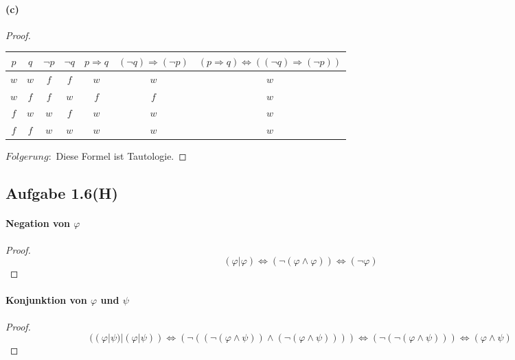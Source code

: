 \paragraph{(c)}
\begin{proof}
$ $\newline
\begin{center}
\begin{tabular}{||c|c||c|c|c|c|c||}
\hline
$p$ & $q$ & $\neg p$ & $\neg q$ & $p\Rightarrow q$ & $(\neg q)\Rightarrow(\neg p)$ & $(p\Rightarrow q)\Leftrightarrow((\neg q)\Rightarrow(\neg p))$ \\
\hline
\hline
$w$ & $w$ & $f$ & $f$ & $w$ & $w$ & $w$ \\
$w$ & $f$ & $f$ & $w$ & $f$ & $f$ & $w$ \\
$f$ & $w$ & $w$ & $f$ & $w$ & $w$ & $w$ \\
$f$ & $f$ & $w$ & $w$ & $w$ & $w$ & $w$ \\
\hline
\end{tabular}
\end{center}
$Folgerung:$ Diese Formel ist Tautologie.
\end{proof}

\newpage

\subsection{Aufgabe 1.6(H)}

\paragraph{Negation von $\varphi$}
\begin{proof}
\begin{equation*}
(\varphi|\varphi)\Leftrightarrow(\neg(\varphi\wedge\varphi))\Leftrightarrow(\neg\varphi)
\end{equation*}
\end{proof}

\paragraph{Konjunktion von $\varphi$ und $\psi$}
\begin{proof}
\begin{equation*}
((\varphi|\psi)|(\varphi|\psi))\Leftrightarrow(\neg((\neg(\varphi\wedge\psi))\wedge(\neg(\varphi\wedge\psi))))\Leftrightarrow(\neg(\neg(\varphi\wedge\psi)))\Leftrightarrow(\varphi\wedge\psi)
\end{equation*}
\end{proof}

